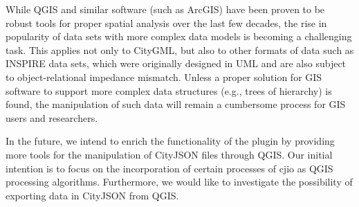 While QGIS and similar software (such as ArcGIS) have been proven to be robust tools for proper spatial analysis over the last few decades, the rise in popularity of data sets with more complex data models is becoming a challenging task. 
This applies not only to CityGML, but also to other formats of data such as INSPIRE data sets, which were originally designed in UML and are also subject to object-relational impedance mismatch. 
Unless a proper solution for GIS software to support more complex data structures (e.g., trees of hierarchy) is found, the
manipulation of such data will remain a cumbersome process for GIS users and researchers.

In the future, we intend to enrich the functionality of the plugin by providing more tools for the manipulation of CityJSON files through QGIS. 
Our initial intention is to focus on the incorporation of certain processes of cjio as QGIS processing algorithms. 
Furthermore, we would like to investigate the possibility of exporting data in CityJSON from QGIS.